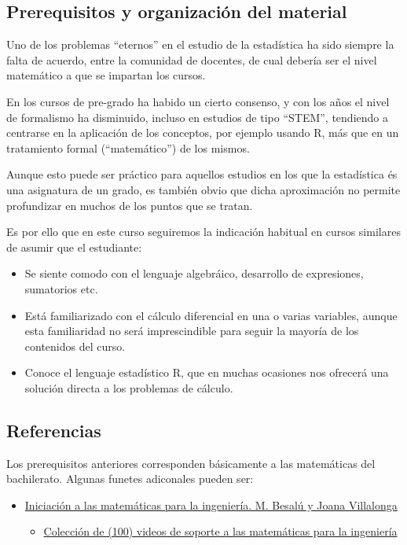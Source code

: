 \documentclass[
]{article}
\providecommand{\tightlist}{%
  \setlength{\itemsep}{0pt}\setlength{\parskip}{0pt}}
\begin{document}
\subsection*{Prerequisitos y organización del material}\label{prerequisitos-y-organizaciuxf3n-del-material}

Uno de los problemas ``eternos'' en el estudio de la estadística ha sido siempre la falta de acuerdo, entre la comunidad de docentes, de cual debería ser el nivel matemático a que se impartan los cursos.

En los cursos de pre-grado ha habido un cierto consenso, y con los años el nivel de formalismo ha disminuido, incluso en estudios de tipo ``STEM'', tendiendo a centrarse en la aplicación de los conceptos, por ejemplo usando R, más que en un tratamiento formal (``matemático'') de los mismos.

Aunque esto puede ser práctico para aquellos estudios en los que la estadística és una asignatura de un grado, es también obvio que dicha aproximación no permite profundizar en muchos de los puntos que se tratan.

Es por ello que en este curso seguiremos la indicación habitual en cursos similares de asumir que el estudiante:

\begin{itemize}
\tightlist
\item
  Se siente comodo con el lenguaje algebráico, desarrollo de expresiones, sumatorios etc.
\item
  Está familiarizado con el cálculo diferencial en una o varias variables, aunque esta familiaridad no será imprescindible para seguir la mayoría de los contenidos del curso.
\item
  Conoce el lenguaje estadístico R, que en muchas ocasiones nos ofrecerá una solución directa a los problemas de cálculo.
\end{itemize}

\subsection*{Referencias}\label{referencias}

Los prerequisitos anteriores corresponden básicamente a las matemáticas del bachilerato. Algunas funetes adiconales pueden ser:

\begin{itemize}
\item
  \href{http://cimanet.uoc.edu/cursMates0/IniciacionMatematicas/pdf/PID_00273914.pdf}{Iniciación a las matemáticas para la ingeniería. M. Besalú y Joana Villalonga}

  \begin{itemize}
  \tightlist
  \item
    \href{https://www.youtube.com/playlist?list=PLv8FweHfYYMo6Lr2zt6H4znq5KuBacq28}{Colección de (100) videos de soporte a las matemáticas para la ingeniería}
  \end{itemize}
\end{itemize}
\end{document}
